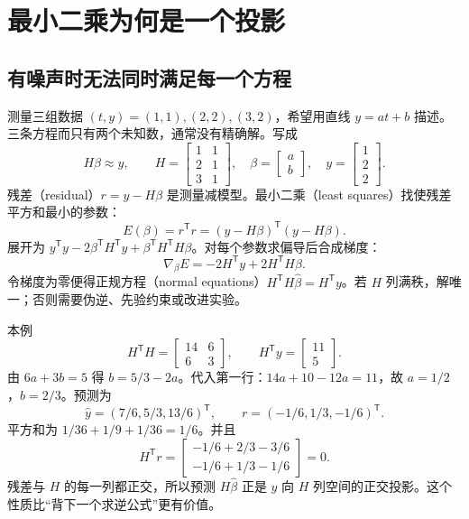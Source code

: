 \section{最小二乘为何是一个投影}
\subsection{有噪声时无法同时满足每一个方程}
测量三组数据 $(t,y)=(1,1),(2,2),(3,2)$，希望用直线 $y=at+b$ 描述。三条方程而只有两个未知数，通常没有精确解。写成
\begin{equation}
 H\beta\approx y,\qquad
 H=\begin{bmatrix}1&1\\2&1\\3&1\end{bmatrix},\quad
 \beta=\begin{bmatrix}a\\b\end{bmatrix},\quad
 y=\begin{bmatrix}1\\2\\2\end{bmatrix}.
\end{equation}
残差（residual）$r=y-H\beta$ 是测量减模型。最小二乘（least squares）找使残差平方和最小的参数：
\begin{equation}
 E(\beta)=r^\mathsf Tr=(y-H\beta)^\mathsf T(y-H\beta).
\end{equation}
展开为 $y^\mathsf Ty-2\beta^\mathsf TH^\mathsf Ty+\beta^\mathsf TH^\mathsf TH\beta$。对每个参数求偏导后合成梯度：
\begin{equation}
 \nabla_\beta E=-2H^\mathsf Ty+2H^\mathsf TH\beta.
\end{equation}
令梯度为零便得正规方程（normal equations）$H^\mathsf TH\hat\beta=H^\mathsf Ty$。若 $H$ 列满秩，解唯一；否则需要伪逆、先验约束或改进实验。
\begin{examplebox}[算例 完整求出直线和每一个残差]
本例
\[
 H^\mathsf TH=\begin{bmatrix}14&6\\6&3\end{bmatrix},\qquad
 H^\mathsf Ty=\begin{bmatrix}11\\5\end{bmatrix}.
\]
由 $6a+3b=5$ 得 $b=5/3-2a$。代入第一行：$14a+10-12a=11$，故 $a=1/2$，$b=2/3$。预测为
\[
 \hat y=(7/6,5/3,13/6)^\mathsf T,
 \qquad r=(-1/6,1/3,-1/6)^\mathsf T.
\]
平方和为 $1/36+1/9+1/36=1/6$。并且
\[
 H^\mathsf Tr=\begin{bmatrix}-1/6+2/3-3/6\\-1/6+1/3-1/6\end{bmatrix}=0.
\]
残差与 $H$ 的每一列都正交，所以预测 $H\hat\beta$ 正是 $y$ 向 $H$ 列空间的正交投影。这个性质比“背下一个求逆公式”更有价值。
\end{examplebox}


